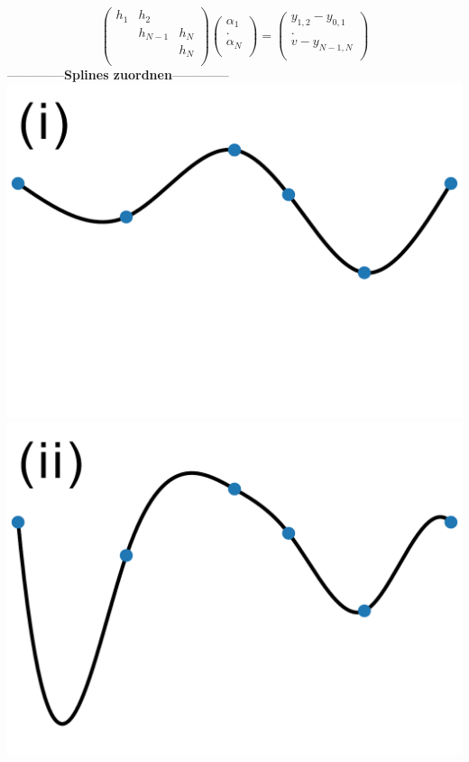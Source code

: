 \[\left(\begin{array}{ccc}
h_1 & h_2 & \\
 & h_{N-1} & h_N \\
 &  & h_N \\
\end{array}\right)
\left(\begin{array}{c}
\alpha_{1}\\
.\\
\alpha_{N}\\
\end{array}\right) = 
\left(\begin{array}{c}
y_{1,2} - y_{0,1}\\
.\\
v - y_{N-1,N}\\
\end{array}\right)
\]
--------------\textbf{Splines zuordnen}--------------\\
\includegraphics[scale=0.08]{content/images/spline_i.pdf}
\includegraphics[scale=0.08]{content/images/spline_ii.pdf}
